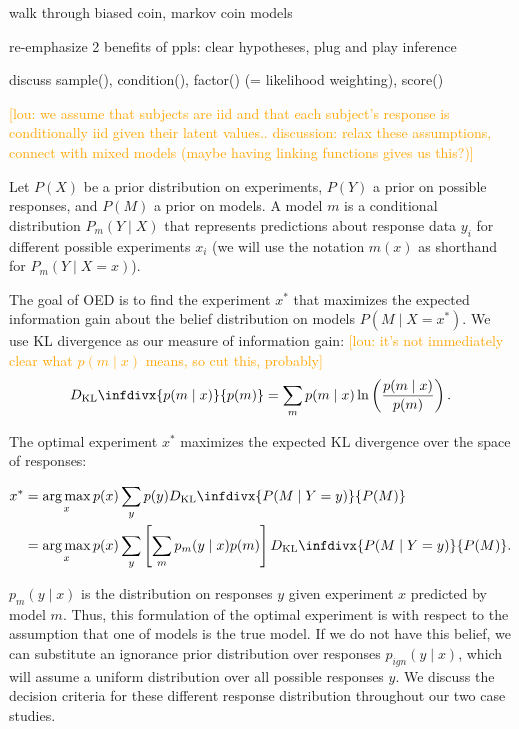 \documentclass{article}
\newcommand{\dkl}{D_\mathrm{KL}\infdivx}
\newcommand{\lou}[1]{\textcolor{orange}{[lou: #1]}}
\newcommand{\cas}[1]{ \textsf{\color{darkgray} \scriptsize #1} }
\DeclareMathOperator*{\argmax}{arg\,max}
\begin{document}
\cas{walk through biased coin, markov coin models}

\cas{re-emphasize 2 benefits of ppls: clear hypotheses, plug and play inference}

\cas{discuss sample(), condition(), factor() (= likelihood weighting), score()}

\lou{we assume that subjects are iid and that each subject's response is conditionally iid given their latent values.. discussion: relax these assumptions, connect with mixed models (maybe having linking functions gives us this?)}

Let $P(X)$ be a prior distribution on experiments, $P(Y)$ a prior on possible responses, and $P(M)$ a prior on models.
A model $m$ is a conditional distribution $P_m(Y \mid X)$ that represents predictions about response data $y_i$ for different possible experiments $x_i$ (we will use the notation $m(x)$ as shorthand for $P_m(Y \mid X = x)$).

The goal of OED is to find the experiment $x^{*}$ that maximizes the expected information gain about the belief distribution on models $P(M \mid X = x^{*})$.
We use KL divergence as our measure of information gain:
\lou{it's not immediately clear what $p(m \mid x)$ means, so cut this, probably}
\begin{align}
  \dkl{ p(m \mid x) }{ p(m) }  = \sum\limits_m p(m \mid x) \ln \left( \frac{p(m \mid x)}{p(m)}\right). \label{eq:kl}
\end{align}

The optimal experiment $x^*$ maximizes the expected KL divergence over the space of responses:

\begin{align}
x^{*} &= \argmax_{x} p(x) \sum\limits_{y} p(y) \dkl{ P(M \mid Y = y) }{ P(M) } \notag \\
    &= \argmax_{x} p(x) \sum\limits_{y} \left[\sum\limits_{m} p_m(y \mid x)p(m)\right] \dkl{P(M \mid Y = y)}{P(M)}. \label{eq:oed}
\end{align}

$p_m(y \mid x)$ is the distribution on responses $y$ given experiment $x$ predicted by model $m$. Thus, this formulation of the optimal experiment is with respect to the assumption that one of models is the true model.
If we do not have this belief, we can substitute an ignorance prior distribution over responses $p_{ign}(y \mid x)$, which will assume a uniform distribution over all possible responses $y$.
We discuss the decision criteria for these different response distribution throughout our two case studies.
\end{document}
